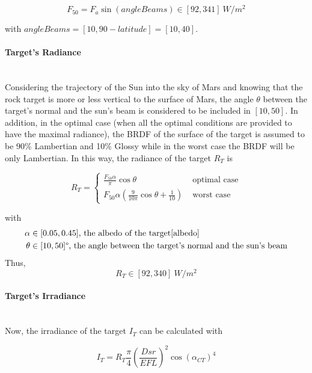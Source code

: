 \begin{equation}
F_{50} = F_a\sin(angleBeams) \in [92, 341] \ W/m^2
\end{equation}

with $angleBeams = [10, 90-latitude] = [10, 40]$\textdegree.

\paragraph{Target's Radiance}
~\\
Considering the trajectory of the Sun into the sky of Mars and knowing that the rock target is more or less vertical to the surface of Mars, the angle $\theta$ between the target's normal and the sun's beam is considered to be included in $[10, 50]$\textdegree. In addition, in the optimal case (when all the optimal conditions are provided to have the maximal radiance), the BRDF of the surface of the target is assumed to be 90\% Lambertian and 10\% Glossy while in the worst case the BRDF will be only Lambertian. In this way, the radiance of the target $R_T$ is

\begin{equation}
\label{eq:Radiance Target}
R_T = \left\{
	\begin{array}{ll}
		\frac{F_{50}\alpha}{\pi}\cos \theta & \mbox{ optimal case} \\
		F_{50}\alpha(\frac{9}{10\pi}\cos\theta + \frac{1}{10}) & \mbox{ worst case}
	\end{array}
\right.
\end{equation}

with 
\begin{align*}
	\alpha & \in [0.05, 0.45]\mbox{, the albedo of the target\ref{albedo}} \\
	\theta & \in [10, 50]\mbox{\textdegree, the angle between the target's normal and the sun's beam}
\end{align*}
Thus, 
\begin{equation}
\label{eq:Radiance Target Range}
R_T \in [92, 340] \ W/m^2
\end{equation}

\paragraph{Target's Irradiance}
~\\
Now, the irradiance of the target $I_T$ can be calculated with

\begin{equation}
\label{eq:Irradiance Target}
I_T = R_T\frac{\pi}{4}\left(\frac{Dsr}{EFL}\right)^2\cos (\alpha_{CT})^4
\end{equation}

